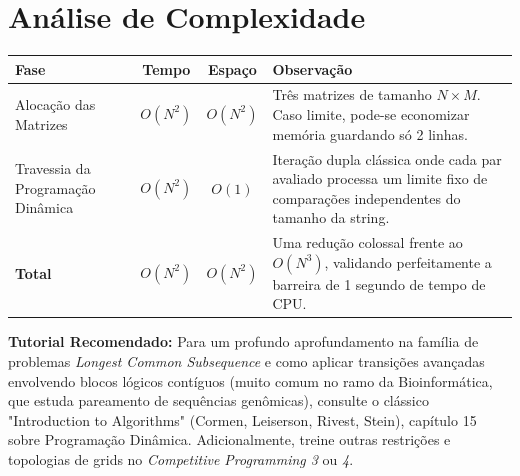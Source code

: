 \documentclass[11pt,a4paper]{article}
\begin{document}
\section*{Análise de Complexidade}

\begin{table}[h]
\centering
\begin{tabularx}{\textwidth}{|X|c|c|X|}
\hline
\textbf{Fase} & \textbf{Tempo} & \textbf{Espaço} & \textbf{Observação} \\
\hline
Alocação das Matrizes & $O(N^2)$ & $O(N^2)$ & Três matrizes de tamanho $N \times M$. Caso limite, pode-se economizar memória guardando só 2 linhas. \\
\hline
Travessia da Programação Dinâmica & $O(N^2)$ & $O(1)$ & Iteração dupla clássica onde cada par avaliado processa um limite fixo de comparações independentes do tamanho da string. \\
\hline
\textbf{Total} & \textbf{$O(N^2)$} & \textbf{$O(N^2)$} & Uma redução colossal frente ao $O(N^3)$, validando perfeitamente a barreira de 1 segundo de tempo de CPU. \\
\hline
\end{tabularx}
\end{table}

\newpage
\begin{notebox}
\textbf{Tutorial Recomendado:}
Para um profundo aprofundamento na família de problemas \textit{Longest Common Subsequence} e como aplicar transições avançadas envolvendo blocos lógicos contíguos (muito comum no ramo da Bioinformática, que estuda pareamento de sequências genômicas), consulte o clássico "Introduction to Algorithms" (Cormen, Leiserson, Rivest, Stein), capítulo 15 sobre Programação Dinâmica. Adicionalmente, treine outras restrições e topologias de grids no \textit{Competitive Programming 3} ou \textit{4}.
\end{notebox}

\vfill
{}
\end{document}
